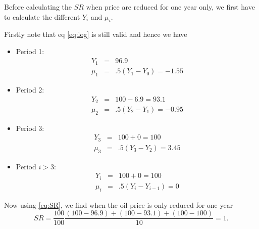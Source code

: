 \documentclass[a4paper] {scrartcl}
\begin{document}
Before calculating the $SR$ when price are reduced for one year only, we first have to calculate the different $Y_i$ and $\mu_i$.

Firstly note that eq \ref{eq:log} is still valid and hence we have

\begin{itemize}
	\item Period 1:
	\begin{eqnarray}
		Y_1 &=& 96.9\\
		\mu_1 &=& .5(Y_1-Y_0) = -1.55
	\end{eqnarray}
	\item Period 2:
	\begin{eqnarray}
		Y_2 &=& 100 -6.9 = 93.1\\
		\mu_2 &=& .5(Y_2-Y_1) = -0.95
	\end{eqnarray}
	\item Period 3:
	\begin{eqnarray}
		Y_3 &=& 100 +0 = 100\\
		\mu_3 &=& .5(Y_3-Y_2) = 3.45
	\end{eqnarray}
	\item Period $i>3$:
	\begin{eqnarray}
		Y_i &=& 100 +0 = 100\\
		\mu_i &=& .5(Y_i-Y_{i-1}) = 0
	\end{eqnarray}
\end{itemize}

Now using \ref{eq:SR}, we find when the oil price is only reduced for one year
\begin{equation}
	SR = \frac{100}{100}\frac{(100-96.9)+(100-93.1)+(100-100)}{10} = 1.
\end{equation}
\end{document}
